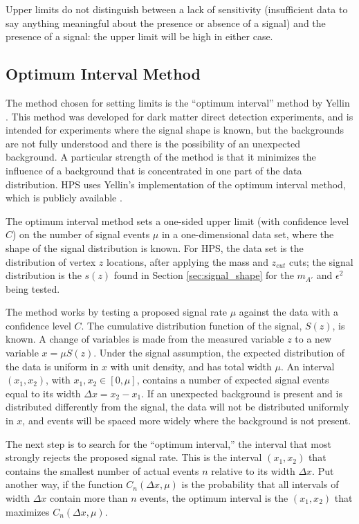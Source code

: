Upper limits do not distinguish between a lack of sensitivity (insufficient data to say anything meaningful about the presence or absence of a signal) and the presence of a signal: the upper limit will be high in either case.

\subsection{Optimum Interval Method}
The method chosen for setting limits is the ``optimum interval'' method by Yellin \cite{yellin_finding_2002}.
This method was developed for dark matter direct detection experiments, and is intended for experiments where the signal shape is known, but the backgrounds are not fully understood and there is the possibility of an unexpected background.
A particular strength of the method is that it minimizes the influence of a background that is concentrated in one part of the data distribution.
HPS uses Yellin's implementation of the optimum interval method, which is publicly available  \cite{yellin_optimum_2011}.

The optimum interval method sets a one-sided upper limit (with confidence level $C$) on the number of signal events $\mu$ in a one-dimensional data set, where the shape of the signal distribution is known.
For HPS, the data set is the distribution of vertex $z$ locations, after applying the mass and $z_{cut}$ cuts; the signal distribution is the $s(z)$ found in Section \ref{sec:signal_shape} for the $m_{A'}$ and $\epsilon^2$ being tested.

The method works by testing a proposed signal rate $\mu$ against the data with a confidence level $C$.
The cumulative distribution function of the signal, $S(z)$, is known.
A change of variables is made from the measured variable $z$ to a new variable $x=\mu S(z)$.
Under the signal assumption, the expected distribution of the data is uniform in $x$ with unit density, and has total width $\mu$.
An interval $(x_1,x_2)$, with $x_1, x_2 \in [0,\mu]$, contains a number of expected signal events equal to its width $\Delta x = x_2-x_1$.
If an unexpected background is present and is distributed differently from the signal, the data will not be distributed uniformly in $x$, and events will be spaced more widely where the background is not present.

The next step is to search for the ``optimum interval,'' the interval that most strongly rejects the proposed signal rate.
This is the interval $(x_1,x_2)$ that contains the smallest number of actual events $n$ relative to its width $\Delta x$.
Put another way, if the function $C_n(\Delta x,\mu)$ is the probability that all intervals of width $\Delta x$ contain more than $n$ events, the optimum interval is the $(x_1,x_2)$ that maximizes $C_n(\Delta x,\mu)$.

